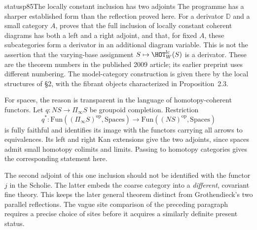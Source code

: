 \begin{dcomment}{status}{p85}{The locally constant inclusion has two adjoints}
The programme has a sharper established form than the reflection proved here. For a derivator $\mathbb D$ and a small category $A$, \citet[Proposition~3.10 and Theorem~3.13]{Cisinski2009LocallyConstant} proves that the full inclusion of locally constant coherent diagrams has both a left and a right adjoint, and that, for fixed $A$, these subcategories form a derivator in an additional diagram variable. This is not the assertion that the varying-base assignment $S\mapsto\HOT_W^{\mathrm{lc}}(S)$ is a derivator. These are the theorem numbers in the published 2009 article; its earlier preprint uses different numbering. The model-category construction is given there by the local structures of \S2, with the fibrant objects characterized in Proposition~2.3.

For spaces, the reason is transparent in the language of homotopy-coherent functors. Let $q:NS\to\Pi_\infty S$ be groupoid completion. Restriction
\[
 q^*:\mathrm{Fun}((\Pi_\infty S)^{\mathrm{op}},\mathrm{Spaces})
       \longrightarrow\mathrm{Fun}((NS)^{\mathrm{op}},\mathrm{Spaces})
\]
is fully faithful and identifies its image with the functors carrying all arrows to equivalences. Its left and right Kan extensions give the two adjoints, since spaces admit small homotopy colimits and limits. Passing to homotopy categories gives the corresponding statement here.

The second adjoint of this one inclusion should not be identified with the functor $j$ in the Scholie. The latter embeds the coarse category into a \emph{different}, covariant fine theory. This keeps the later general theorem distinct from Grothendieck's two parallel reflections. The vague site comparison of the preceding paragraph requires a precise choice of sites before it acquires a similarly definite present status.
\end{dcomment}

